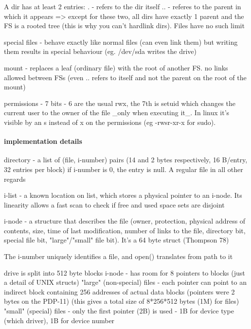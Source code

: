 \documentclass[a4paper]{report}
\begin{document}
        A dir has at least 2 entries:
            . - refers to the dir itself
            .. - referes to the parent in which it appears
        => except for these two, all dirs have exactly 1 parent and the FS is a
        rooted tree (this is why you can't hardlink dirs). Files have no such limit

        special files - behave exactly like normal files (can even link them)
        but writing them results in special behaviour (eg. /dev/sda writes the
        drive)

        mount - replaces a leaf (ordinary file) with the root of another FS.
        no links allowed between FSs (even .. refers to itself and not the
        parent on the root of the mount)

        permissions - 7 bits - 6 are the usual rwx, the 7th is setuid which
        changes the current user to the owner of the file \_only when executing
        it\_. In linux it's visible by an s instead of x on the permissions (eg
        -rwsr-xr-x for sudo).

        \paragraph{implementation details}

        directory - a list of (file, i-number) pairs (14 and 2 bytes
        respectively, 16 B/entry, 32 entries per block) if i-number is 0, the
        entry is null. A regular file in all other regards

        i-list - a known location on list, which stores a physical pointer to
        an i-node. Its linearity allows a fast scan to check if free and used
        space sets are disjoint

        i-node - a structure that describes the file (owner, protection,
        physical address of contents, size, time of last modification, number
        of links to the file, directory bit, special file bit, "large"/"small" file
        bit). It's a 64 byte struct (Thompson 78)

        The i-number uniquely identifies a file, and open() translates from
        path to it

        drive is split into 512 byte blocks
        i-node - has room for 8 pointers to blocks (just a detail of UNIX structs)
        "large" (non-special) files - each pointer can point to an indirect
        block containing 256 addresses of actual data blocks (pointers were 2
        bytes on the PDP-11) (this gives a total size of 8*256*512 bytes (1M)
        for files)
        "small" (special) files - only the first pointer (2B) is used - 1B for
        device type (which driver), 1B for device number
\end{document}
